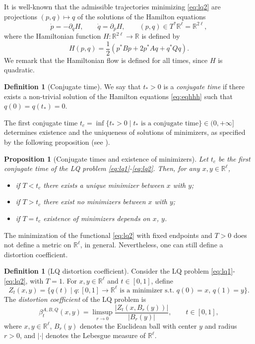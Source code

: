 \documentclass[11pt,a4paper]{article}
\theoremstyle{plain}
\newtheorem{proposition}[theorem]{Proposition}
\theoremstyle{definition}
\newtheorem{definition}[theorem]{Definition}
\theoremstyle{remark}
\numberwithin{equation}{section}
\newcommand{\R}{\mathbb{R}} %
\begin{document}
It is well-known that the admissible trajectories minimizing \eqref{eq:lq2} are projections $(p,q) \mapsto q$ of the solutions of the Hamilton equations
\begin{equation} \label{eq:eqhhh}
\dot{p}  = -\partial_q H, \qquad \dot{q} = \partial_p H, \qquad (p,q) \in T^*\R^\ell = \R^{2\ell},
\end{equation}
where the Hamiltonian function $H: \mathbb{R}^{2\ell} \to \mathbb{R}$ is defined by
\begin{equation}\label{eq:Hamiltonian}
H(p,q) = \frac{1}{2}\left( p^* B p +2 p^* A q + q^* Q q \right).
\end{equation}
We remark that the Hamiltonian flow is defined for all times, since $H$ is quadratic.

\begin{definition}[Conjugate time]
We say that $t_*>0$ is a \emph{conjugate time} if there exists a non-trivial solution of the Hamilton equations \eqref{eq:eqhhh} such that $q(0) = q(t_*) = 0$.
\end{definition}

The first conjugate time $t_c = \inf\{t_*>0 \mid t_* \text{ is a conjugate time}\} \in (0,+\infty]$ determines existence and the uniqueness of solutions of minimizers, as specified by the following proposition (see \cite[Sec.\ 16.4]{Agrachevbook}).
 
\begin{proposition}[Conjugate times and existence of minimizers]\label{p:LQconj}
Let $t_c$ be the first conjugate time of the LQ problem \eqref{eq:lq1}-\eqref{eq:lq2}. Then, for any $x,y\in \R^\ell$,
\begin{itemize}
\item if $T<t_c$ there exists a unique minimizer between $x$ with $y$;
\item if $T>t_c$ there exist no minimizers between $x$ with $y$;
\item if $T= t_c$ existence of minimizers depends on $x$, $y$.
\end{itemize}
\end{proposition}

The minimization of the functional \eqref{eq:lq2} with fixed endpoints and $T>0$ does not define a metric on $\R^{\ell}$, in general. Nevertheless, one can still define a distortion coefficient.

\begin{definition}[LQ distortion coefficient]\label{d:LQdist}
Consider the LQ problem \eqref{eq:lq1}-\eqref{eq:lq2}, with $T=1$. For $x,y \in \R^\ell$ and $t\in[0,1]$, define
\begin{equation}
Z_{t}(x,y)=\{q(t)\mid q : [0,1] \to \R^\ell  \text{ is a minimizer s.t. } q(0) = x,\, q(1) = y\}.
\end{equation}
The \emph{distortion coefficient} of the LQ problem is
\begin{equation}
\beta_{t}^{A,B,Q}(x,y)=\limsup_{r\to 0}\frac{|Z_{t}(x,B_{r}(y))|}{|B_{r}(y)|}, \qquad t \in [0,1],
\end{equation}
where $x,y\in \R^\ell$, $B_r(y)$ denotes the Euclidean ball with center $y$ and radius $r>0$, and $|\cdot|$ denotes the Lebesgue measure of $\R^\ell$.
\end{definition}
\end{document}
